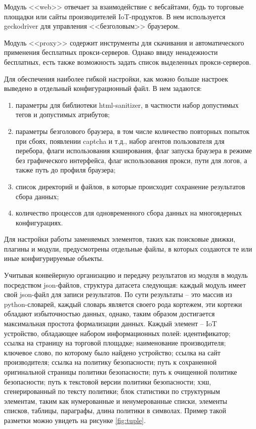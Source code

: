 \documentclass[../main]{subfiles}
\begin{document}
Модуль <<web>> отвечает за взаимодействие с вебсайтами, будь то торговые площадки или сайты производителей IoT-продуктов. В нем используется geckodriver для управления <<безголовым>> браузером. 

Модуль <<proxy>> содержит инструменты для скачивания и автоматического применения бесплатных прокси-серверов. Однако ввиду ненадежности бесплатных, есть также возможность задать список выделенных прокси-серверов. 

Для обеспечения наиболее гибкой настройки, как можно больше настроек выведено в отдельный конфигурационный файл. В нем задаются:

\begin{enumerate}
    \item параметры для библиотеки html-sanitizer, в частности набор допустимых тегов и допустимых атрибутов;
    \item параметры безголового браузера, в том числе количество повторных попыток при сбоях, появлении captcha и т.д., набор агентов пользователя для перебора, флаги использования кэширования, флаг запуска браузера в режиме без графического интерфейса, флаг использования прокси, пути для логов, а также путь до профиля браузера;
    \item список директорий и файлов, в которые происходит сохранение результатов сбора данных;
    \item количество процессов для одновременного сбора данных на многоядерных конфигурациях.
\end{enumerate}

Для настройки работы заменяемых элементов, таких как поисковые движки, плагины и модули, предусмотрены отдельные файлы, в которых создаются те или иные конфигурируемые объекты.

Учитывая конвейерную организацию и передачу результатов из модуля в модуль посредством json-файлов, структура датасета следующая: каждый модуль имеет свой json-файл для записи результатов. По сути результаты -- это массив из python-словарей, каждый словарь является своего рода кортежем, эти кортежи обладают избыточностью данных, однако, таким образом достигается максимальная простота формализации данных. Каждый элемент -- IoT устройство, обладающее набором информационных полей: идентификатор; ссылка на страницу на торговой площадке; наименование производителя; ключевое слово, по которому было найдено устройство; ссылка на сайт производителя; ссылка на политику безопасности; путь к сохраненной оригинальной страницы политики безопасности; путь к очищенной политике безопасности; путь к текстовой версии политики безопасности; хэш, сгенерированный по тексту политики; блок статистики по структурным элементам, таким как нумерованные и ненумерованные списки, элементы списков, таблицы, параграфы, длина политики в символах. Пример такой разметки можно увидеть на рисунке \ref{fig:tuple}.
\end{document}
